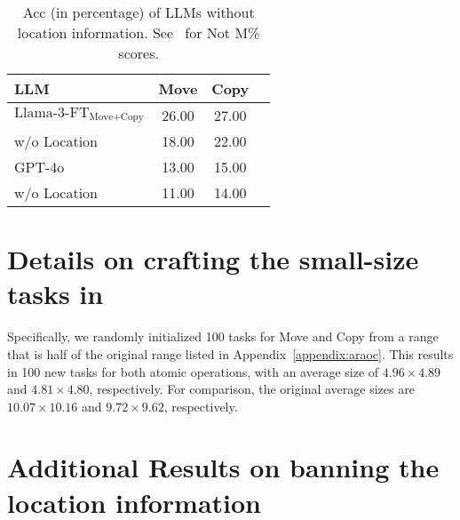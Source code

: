 \begin{table}[tb]
\small
\centering
\setlength{\tabcolsep}{4mm}
\begin{tabular}{l|ccc}
\toprule
LLM& Move & Copy \\
\midrule
$\text{Llama-3-FT}_{\text{Move+Copy}}$ &26.00 &27.00 \\
 \quad \quad \quad w/o Location &18.00 &22.00 \\
 \midrule
GPT-4o & 13.00& 15.00\\
 \quad \quad \quad w/o Location &11.00 & 14.00\\
\bottomrule
\end{tabular}
\caption{Acc (in percentage) of LLMs without location information. See~ for Not M\% scores.}%

\vspace{-0.1in}
\label{tab:location}
\end{table}

\section{Details on crafting the small-size tasks in~}
\label{appendix:small size}
Specifically, we randomly initialized 100 tasks for Move and Copy from a range that is half of the original range listed in Appendix~\ref{appendix:araoc}. This results in 100 new tasks for both atomic operations, with an average size of $4.96 \times 4.89$ and $4.81 \times 4.80$, respectively. For comparison, the original average sizes are $10.07 \times 10.16$ and $9.72 \times 9.62$, respectively.

\section{Additional Results on banning the location information}
\label{appendix:banning}

